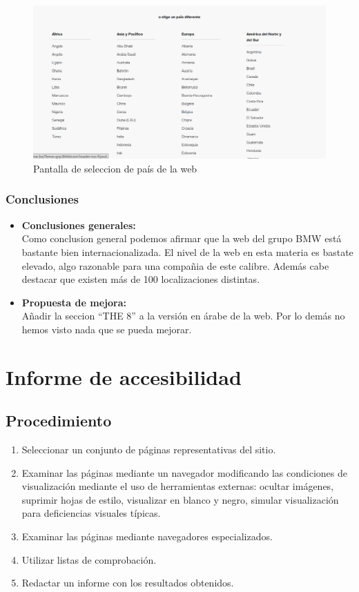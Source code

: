 \documentclass[a4paper,11pt]{article}
\begin{document}
\begin{itemize}
\begin{figure}[H]
  \centering
  \includegraphics[scale=0.3]{elige_idioma.png}
  \caption{Pantalla de seleccion de país de la web}
  \label{fig:selectpais}
\end{figure}


\end{itemize}

\subsubsection{Conclusiones}
\begin{itemize}
\item \textbf{Conclusiones generales:}\\
Como conclusion general podemos afirmar que la web del grupo BMW está bastante bien internacionalizada. El nivel de la web en esta materia es bastate elevado, algo razonable para una compañia de este calibre. Además cabe destacar que existen más de 100 localizaciones distintas.

\item \textbf{Propuesta de mejora:}\\
Añadir la seccion ``THE 8'' a la versión en árabe de la web. Por lo demás no hemos visto nada que se pueda mejorar.


\end{itemize}

\section{Informe de accesibilidad}
\subsection{Procedimiento}
\begin{enumerate}
\item Seleccionar un conjunto de páginas representativas del sitio.
\item Examinar las páginas mediante un navegador modificando las condiciones de visualización mediante el uso de herramientas externas: ocultar imágenes, suprimir hojas de estilo, visualizar en blanco y negro, simular visualización para deficiencias visuales típicas.
\item Examinar las páginas mediante navegadores especializados.
\item Utilizar listas de comprobación.
\item Redactar un informe con los resultados obtenidos.
\end{enumerate}
\end{document}
